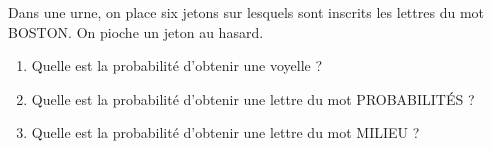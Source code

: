 
Dans une urne, on place six jetons sur lesquels sont inscrits les lettres du mot BOSTON. On pioche un jeton au hasard.


\begin{enumerate}
\item Quelle est la probabilité d'obtenir une voyelle ?
\item Quelle est la probabilité d'obtenir une lettre du mot PROBABILITÉS ?
\item Quelle est la probabilité d'obtenir une lettre du mot MILIEU ?
\end{enumerate}